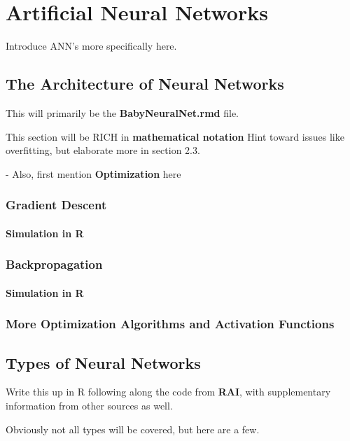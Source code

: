 \chapter{Artificial Neural Networks}
Introduce ANN's more specifically here.


\section{The Architecture of Neural Networks} %
This will primarily be the \textbf{BabyNeuralNet.rmd} file.

This section will be RICH in \textbf{mathematical notation}
Hint toward issues like overfitting, but elaborate more in section 2.3.

- Also, first mention \textbf{Optimization} here

\subsection{Gradient Descent}

\subsubsection{Simulation in R}

\subsection{Backpropagation}

\subsubsection{Simulation in R}

\subsection{More Optimization Algorithms and Activation Functions}

\section{Types of Neural Networks} %

Write this up in R following along the code from \textbf{RAI}, with supplementary information from other sources as well.  

Obviously not all types will be covered, but here are a few.  


